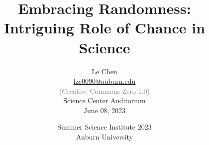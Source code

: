 


\title %
{
  Embracing Randomness: \\ \medskip
  Intriguing Role of Chance in Science
}


\author{
  Le Chen\\
  {\small\url{lzc0090@auburn.edu}}\\[1em]
  \textcolor{gray}{\small (Creative Commons Zero 1.0)} \\[3em]
  {\small Science Center Auditorium}\\[1em]
  {\small June 08, 2023}
}



\date[Auburn]{
  Summer Science Institute 2023\\
  Auburn University
}


